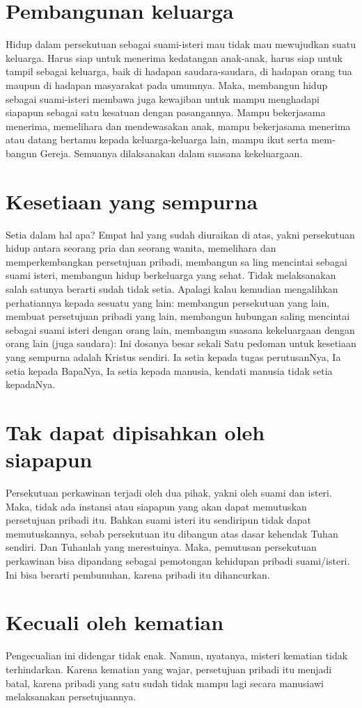 \section{Pembangunan keluarga}
Hidup dalam persekutuan sebagai suami-isteri mau tidak mau mewujudkan suatu keluarga. Harus siap untuk menerima kedatangan anak-anak, harus siap untuk tampil sebagai keluarga, baik di hadapan saudara-saudara, di hadapan orang tua maupun di hadapan masya­rakat pada umumnya. Maka, membangun hidup sebagai suami-isteri membawa juga kewajiban untuk mampu menghadapi siapapun sebagai satu kesatuan dengan pasangannya. Mampu bekerjasama menerima, meme­lihara dan mendewasakan anak, mampu bekerjasama menerima atau da­tang bertamu kepada keluarga-keluarga lain, mampu ikut serta mem­bangun Gereja. Semuanya dilaksanakan dalam suasana kekeluargaan.

\section{Kesetiaan yang sempurna}
Setia dalam hal apa? Empat hal yang sudah diuraikan di atas, yakni persekutuan hidup antara seorang pria dan seorang wanita, memelihara dan memperkembangkan persetujuan pribadi, membangun sa ling mencintai sebagai suami isteri, membangun hidup berkeluarga yang sehat. Tidak melaksanakan salah satunya berarti sudah tidak setia. Apalagi kalau kemudian mengalihkan perhatiannya kepada se­suatu yang lain: membangun persekutuan yang lain, membuat perse­tujuan pribadi yang lain, membangun hubungan saling mencintai sebagai suami isteri dengan orang lain, membangun suasana kekeluargaan dengan orang lain (juga saudara): Ini dosanya besar sekali
Satu pedoman untuk kesetiaan yang sempurna adalah Kristus sen­diri. Ia setia kepada tugas perutusanNya, Ia setia kepada Bapa­Nya, Ia setia kepada manusia, kendati manusia tidak setia kepadaNya.

\section{Tak dapat dipisahkan oleh siapapun}
Persekutuan perkawinan terjadi oleh dua pihak, yakni oleh sua­mi dan isteri. Maka, tidak ada instansi atau siapapun yang akan dapat memutuskan persetujuan pribadi itu. Bahkan suami isteri itu sendiripun tidak dapat memutuskannya, sebab persekutuan itu dibangun atas dasar kehendak Tuhan sendiri. Dan Tuhanlah yang merestuinya. Maka, pemutusan persekutuan perkawinan bisa dipandang sebagai pemotongan kehidupan pribadi suami/isteri. Ini bisa be­rarti pembunuhan, karena pribadi itu dihancurkan.

\section{Kecuali oleh kematian}
Pengecualian ini didengar tidak enak. Namun, nyatanya, misteri kematian tidak terhindarkan. Karena kematian yang wajar, persetu­juan pribadi itu menjadi batal, karena pribadi yang satu sudah tidak mampu lagi secara manusiawi melaksanakan persetujuannya. 

